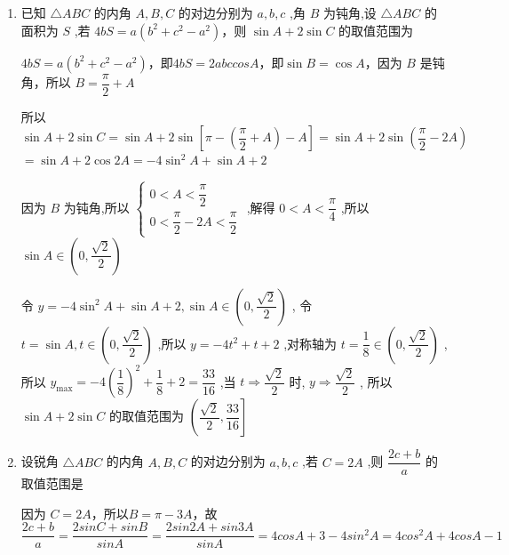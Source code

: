 \begin{enumerate}
\begin{enumerate}
    \begin{jieda}
        \begin{enumerate}
            \item $\sqrt{3}tanAtanB - tanA - tanB = \sqrt{3}$即$-\sqrt{3}(1-tanAtanB) = -(tanA + tanB)$，即$\sqrt{3} = -tan(A+B) = tanC$，故$C = \dfrac{\pi}{3}$
            \item 根据正弦定理有$\dfrac{a}{sinA} = \dfrac{b}{sinB} = \dfrac{c}{sinC} = \dfrac{2}{\dfrac{\sqrt{3}}{2}} = \dfrac{4\sqrt{3}}{3}$，因此$a^2+b^2 = \dfrac{16}{3}(sin^2A + sin^2B) = \dfrac{16}{3}(sin^2A + sin^2(\dfrac{2\pi}{3}-A)) = \dfrac{16}{3}(1+\dfrac{1}{2}sin(2A - \dfrac{\pi}{6}))(A \in (\dfrac{\pi}{6}, \dfrac{\pi}{2}))$，因此$a^2+b^2 \in \left(\dfrac{20}{3}, 8 \right]$
        \end{enumerate}        
    \end{jieda}
    \item 已知 $\bigtriangleup {ABC}$ 的内角 $A,B,C$ 的对边分别为 $a,b,c$ ,角 $B$ 为钝角,设 $\bigtriangleup {ABC}$ 的面积为 $S$ ,若 ${4bS} = a\left( {{b}^{2} + {c}^{2} - {a}^{2}}\right)$，则 $\sin A + 2\sin C$ 的取值范围为
    \begin{jieda}
        ${4bS} = a\left( {{b}^{2} + {c}^{2} - {a}^{2}}\right)$，即$4bS = 2abc cosA$，即$\sin B = \cos A$，因为 $B$ 是钝角，所以 $B = \dfrac{\pi }{2} + A$
        
        所以 $\sin A + 2\sin C = \sin A + 2\sin \left\lbrack  {\pi  - \left( {\dfrac{\pi }{2} + A}\right)  - A}\right\rbrack   = \sin A + 2\sin \left( {\dfrac{\pi }{2} - {2A}}\right)$
        $= \sin A + 2\cos {2A} =  - 4{\sin }^{2}A + \sin A + 2$

        因为 $B$ 为钝角,所以 $\left\{  \begin{array}{l} 0 < A < \dfrac{\pi }{2} \\  0 < \dfrac{\pi }{2} - {2A} < \dfrac{\pi }{2} \end{array}\right.$ ,解得 $0 < A < \dfrac{\pi }{4}$ ,所以 $\sin A \in  \left( {0,\dfrac{\sqrt{2}}{2}}\right)$

        令 $y =  - 4{\sin }^{2}A + \sin A + 2,\sin A \in  \left( {0,\dfrac{\sqrt{2}}{2}}\right)$ ,
        令 $t = \sin A,t \in  \left( {0,\dfrac{\sqrt{2}}{2}}\right)$ ,所以 $y =  - 4{t}^{2} + t + 2$ ,对称轴为 $t = \dfrac{1}{8} \in  \left( {0,\dfrac{\sqrt{2}}{2}}\right)$ ,
        所以 ${y}_{\max } =  - 4{\left( \dfrac{1}{8}\right) }^{2} + \dfrac{1}{8} + 2 = \dfrac{33}{16}$ ,当 $t \Longrightarrow  \dfrac{\sqrt{2}}{2}$ 时, $y \Longrightarrow  \dfrac{\sqrt{2}}{2}$ ,
        所以 $\sin A + 2\sin C$ 的取值范围为 $\left( {\dfrac{\sqrt{2}}{2},\dfrac{33}{16}}\right\rbrack$
    \end{jieda}
    \item 设锐角 $\bigtriangleup  {ABC}$ 的内角 $A,B,C$ 的对边分别为 $a,b,c$ ,若 $C = {2A}$ ,则 $\dfrac{{2c} + b}{a}$ 的取值范围是
    \begin{jieda}
        因为 $C = {2A}$，所以$B = \pi -3A$，故$\dfrac{{2c} + b}{a} = \dfrac{2sinC+sinB}{sinA} = \dfrac{2sin2A+sin3A}{sinA} = 4cosA + 3 - 4sin^2A = 4cos^2A + 4cosA - 1$
        

\end{jieda}
\end{enumerate}
\end{enumerate}
